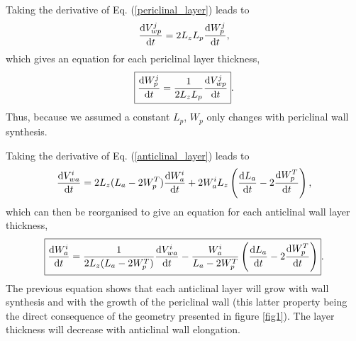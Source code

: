 \documentclass[]{article}
\begin{document}
Taking the derivative of Eq. (\ref{periclinal_layer}) leads to
\begin{equation}
	\frac{{\rm d} V_{wp}^j}{{\rm d} t}=2L_zL_p\frac{{\rm d} W_{p}^j}{{\rm d} t},
\end{equation}
which gives an equation for each periclinal layer thickness,
\begin{equation}
	\boxed{
	\frac{{\rm d} W_{p}^j}{{\rm d} t}=\frac{1}{2L_zL_p}\frac{{\rm d} V_{wp}^j}{{\rm d} t}}.
\end{equation}
Thus, because we assumed a constant $L_p$, $W_p$ only changes with periclinal wall synthesis.

Taking the derivative of Eq. (\ref{anticlinal_layer}) leads to
\begin{equation}
	\frac{{\rm d} V_{wa}^i}{{\rm d} t}=2L_z(L_a-2W_p^T)\frac{{\rm d} W_{a}^i}{{\rm d} t} +2W_a^iL_z\left(\frac{{\rm d} L_a}{{\rm d} t}-2\frac{{\rm d} W_p^T}{{\rm d} t}\right),
\end{equation}
which can then be reorganised to give an equation for each anticlinal wall layer thickness,
\begin{equation}\label{anticlinal_thickness}
	\boxed{
	\frac{{\rm d} W_{a}^i}{{\rm d} t}=\frac{1}{2L_z(L_a-2W_p^T)}\frac{{\rm d} V_{wa}^i}{{\rm d} t}  - \frac{W_a^i}{L_a-2W_p^T}\left(\frac{{\rm d} L_a}{{\rm d} t}-2\frac{{\rm d} W_p^T}{{\rm d} t}\right)}.
\end{equation}
The previous equation shows that each anticlinal layer will grow with wall synthesis and with the growth of the periclinal wall (this latter property being the direct consequence of the geometry presented in figure \ref{fig1}). The layer thickness will decrease with anticlinal wall elongation.
\end{document}

